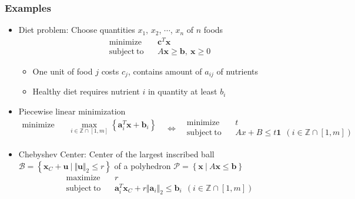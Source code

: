 \subsubsection*{Examples}
\begin{itemize}
    \item Diet problem: Choose quantities $x_1$, $x_2$, $\cdots$, $x_n$ of $n$ foods
    $$ \begin{aligned}
        \mathrm{minimize}~~&~~\mathbf{c}^T \mathbf{x} \\
        \mathrm{subject~to}~~&~~A\mathbf{x} \geq \mathbf{b},~\mathbf{x} \geq 0
    \end{aligned} $$
    \begin{itemize}
        \item One unit of food $j$ costs $c_j$, contains amount of $a_{ij}$ of nutrients
        \item Healthy diet requires nutrient $i$ in quantity at least $b_i$
    \end{itemize}
    \item Piecewise linear minimization
    $$ \begin{aligned}
        \mathrm{minimize}~~&~~\max_{i \in \mathbb{Z} \cap [1,m]} \left\{ \mathbf{a}_i^T\mathbf{x} + \mathbf{b}_i \right\} \\ {}
    \end{aligned}~~~\Leftrightarrow~~~\begin{aligned}
        \mathrm{minimize}~~&~~t \\
        \mathrm{subject~to}~~&~~Ax + B \leq t\mathbf{1}~~(i \in \mathbb{Z} \cap [1,m])
    \end{aligned} $$
    \item Chebyshev Center: Center of the largest inscribed ball $\mathcal{B} = \left\{\mathbf{x}_C+\mathbf{u}~|~\Vert\mathbf{u}\Vert_2\leq r \right\}$
        of a polyhedron $\mathcal{P} = \left\{\mathbf{x}~|~A\mathbf{x}\leq\mathbf{b} \right\}$
    $$ \begin{aligned}
        \mathrm{maximize}~~&~~r \\
        \mathrm{subject~to}~~&~~\mathbf{a}_i^T \mathbf{x}_C + r\Vert\mathbf{a}_i\Vert_2\leq\mathbf{b}_i~~(i \in \mathbb{Z} \cap [1,m])
    \end{aligned} $$
\end{itemize}

